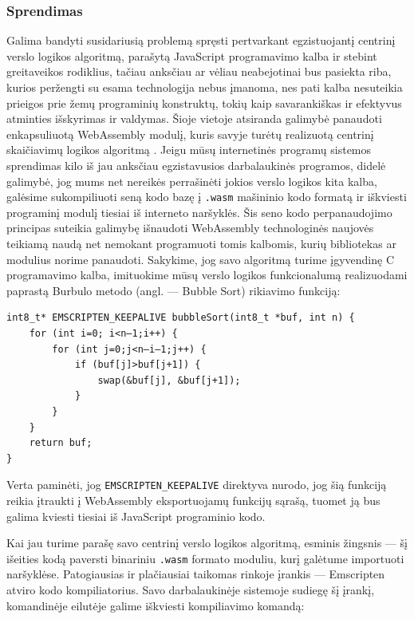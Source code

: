 \documentclass{VUMIFPSkursinis}
\begin{document}
\subsubsection{Sprendimas}
Galima bandyti susidariusią problemą spręsti pertvarkant egzistuojantį centrinį verslo logikos algoritmą, parašytą JavaScript programavimo kalba ir stebint greitaveikos rodiklius, tačiau anksčiau ar vėliau neabejotinai bus pasiekta riba, kurios peržengti su esama technologija nebus įmanoma, nes pati kalba nesuteikia prieigos prie žemų programinių konstruktų, tokių kaip savarankiškas ir efektyvus atminties išskyrimas ir valdymas. 
Šioje vietoje atsiranda galimybė panaudoti enkapsuliuotą WebAssembly modulį, kuris savyje turėtų realizuotą centrinį skaičiavimų logikos algoritmą \cite{Cal17}. Jeigu mūsų internetinės programų sistemos sprendimas kilo iš jau anksčiau egzistavusios darbalaukinės programos, didelė galimybė, jog mums net nereikės perrašinėti jokios verslo logikos kita kalba, galėsime sukompiliuoti seną kodo bazę į \verb|.wasm| mašininio kodo formatą ir iškviesti programinį modulį tiesiai iš interneto naršyklės. Šis seno kodo perpanaudojimo principas suteikia galimybę išnaudoti WebAssembly technologinės naujovės teikiamą naudą net nemokant programuoti tomis kalbomis, kurių bibliotekas ar modulius norime panaudoti. Sakykime, jog savo algoritmą turime įgyvendinę C programavimo kalba, imituokime mūsų verslo logikos funkcionalumą realizuodami paprastą Burbulo metodo (angl. — Bubble Sort) rikiavimo funkciją:

\begin{center}
\begin{small}
\begin{verbatim}
int8_t* EMSCRIPTEN_KEEPALIVE bubbleSort(int8_t *buf, int n) {
    for (int i=0; i<n—1;i++) {
        for (int j=0;j<n—i—1;j++) {
            if (buf[j]>buf[j+1]) {
                swap(&buf[j], &buf[j+1]);
            }
        }
    }
    return buf;
}
\end{verbatim}
\end{small}
\end{center}

Verta paminėti, jog \verb|EMSCRIPTEN_KEEPALIVE| direktyva nurodo, jog šią funkciją reikia įtraukti į WebAssembly eksportuojamų funkcijų sąrašą, tuomet ją bus galima kviesti tiesiai iš JavaScript programinio kodo. \cite{EMD17}

Kai jau turime parašę savo centrinį verslo logikos algoritmą, esminis žingsnis — šį išeities kodą paversti binariniu \verb|.wasm| formato moduliu, kurį galėtume importuoti naršyklėse. Patogiausias ir plačiausiai taikomas rinkoje įrankis — Emscripten atviro kodo kompiliatorius. Savo darbalaukinėje sistemoje sudiegę šį įrankį, komandinėje eilutėje galime iškviesti kompiliavimo komandą:
\end{document}
